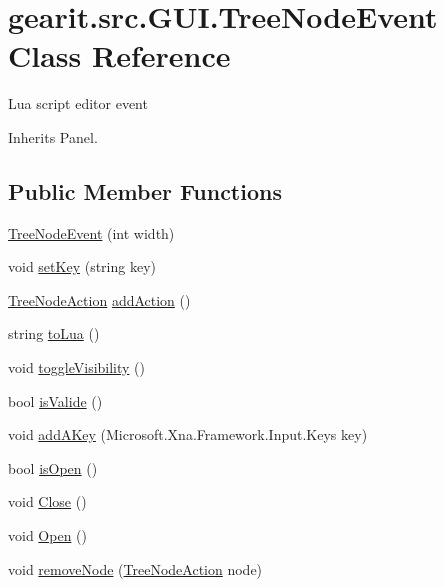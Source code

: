 \hypertarget{classgearit_1_1src_1_1_g_u_i_1_1_tree_node_event}{\section{gearit.\+src.\+G\+U\+I.\+Tree\+Node\+Event Class Reference}
\label{classgearit_1_1src_1_1_g_u_i_1_1_tree_node_event}
}


Lua script editor event  




Inherits Panel.

\subsection*{Public Member Functions}
\begin{DoxyCompactItemize}
\item 
\hyperlink{classgearit_1_1src_1_1_g_u_i_1_1_tree_node_event_a793877eaff33c5285d171e4de39ef65c}{Tree\+Node\+Event} (int width)
\item 
void \hyperlink{classgearit_1_1src_1_1_g_u_i_1_1_tree_node_event_a6a1509b7214968fca07ed3d0018b7afa}{set\+Key} (string key)
\item 
\hyperlink{classgearit_1_1src_1_1_g_u_i_1_1_tree_node_action}{Tree\+Node\+Action} \hyperlink{classgearit_1_1src_1_1_g_u_i_1_1_tree_node_event_af1574dafd6b733eed75b61c35a3b2fd0}{add\+Action} ()
\item 
string \hyperlink{classgearit_1_1src_1_1_g_u_i_1_1_tree_node_event_a7708bc85c1e4eb9dad27e27c8a6784a0}{to\+Lua} ()
\item 
void \hyperlink{classgearit_1_1src_1_1_g_u_i_1_1_tree_node_event_a52ea75063ad02a7046c998c66ba9f75c}{toggle\+Visibility} ()
\item 
bool \hyperlink{classgearit_1_1src_1_1_g_u_i_1_1_tree_node_event_ae8225271439ac48fc8c96a30aeca0460}{is\+Valide} ()
\item 
void \hyperlink{classgearit_1_1src_1_1_g_u_i_1_1_tree_node_event_a32727ad934162d1b8421dd4ba716606d}{add\+A\+Key} (Microsoft.\+Xna.\+Framework.\+Input.\+Keys key)
\item 
bool \hyperlink{classgearit_1_1src_1_1_g_u_i_1_1_tree_node_event_adba7edeb809e69a570193f23c9f1e2ad}{is\+Open} ()
\item 
void \hyperlink{classgearit_1_1src_1_1_g_u_i_1_1_tree_node_event_aec5b77df4325270ae065dda43c8c5526}{Close} ()
\item 
void \hyperlink{classgearit_1_1src_1_1_g_u_i_1_1_tree_node_event_ad0792632f561aad4867ac0041adf1ded}{Open} ()
\item 
void \hyperlink{classgearit_1_1src_1_1_g_u_i_1_1_tree_node_event_a93e50fc52d1e28b91dcfd87e75a41d85}{remove\+Node} (\hyperlink{classgearit_1_1src_1_1_g_u_i_1_1_tree_node_action}{Tree\+Node\+Action} node)
\end{DoxyCompactItemize}
